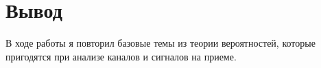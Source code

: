 \chapter{Вывод}
\label{ch:сhap5}

В ходе работы я повторил базовые темы из теории вероятностей, которые пригодятся при анализе каналов и сигналов на приеме.